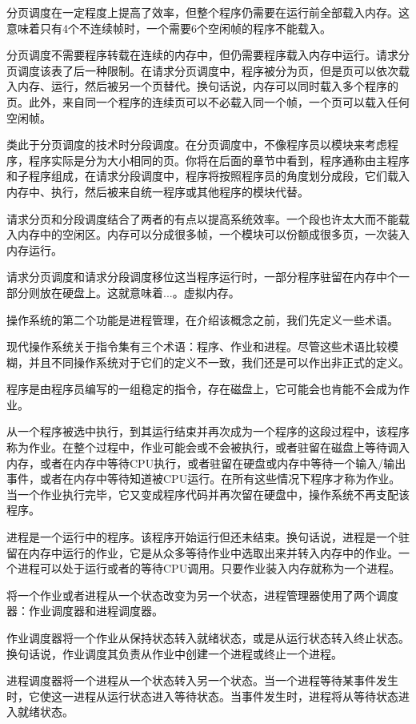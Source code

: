 分页调度在一定程度上提高了效率，但整个程序仍需要在运行前全部载入内存。这意味着只有4个不连续帧时，一个需要6个空闲帧的程序不能载入。

分页调度不需要程序转载在连续的内存中，但仍需要程序载入内存中运行。请求分页调度该表了后一种限制。在请求分页调度中，程序被分为页，但是页可以依次载入内存、运行，然后被另一个页替代。换句话说，内存可以同时载入多个程序的页。此外，来自同一个程序的连续页可以不必载入同一个帧，一个页可以载入任何空闲帧。

类此于分页调度的技术时分段调度。在分页调度中，不像程序员以模块来考虑程序，程序实际是分为大小相同的页。你将在后面的章节中看到，程序通称由主程序和子程序组成，在请求分段调度中，程序将按照程序员的角度划分成段，它们载入内存中、执行，然后被来自统一程序或其他程序的模块代替。

请求分页和分段调度结合了两者的有点以提高系统效率。一个段也许太大而不能载入内存中的空闲区。内存可以分成很多帧，一个模块可以份额成很多页，一次装入内存运行。

请求分页调度和请求分段调度移位这当程序运行时，一部分程序驻留在内存中个一部分则放在硬盘上。这就意味着...。虚拟内存。

操作系统的第二个功能是进程管理，在介绍该概念之前，我们先定义一些术语。

现代操作系统关于指令集有三个术语：程序、作业和进程。尽管这些术语比较模糊，并且不同操作系统对于它们的定义不一致，我们还是可以作出非正式的定义。

程序是由程序员编写的一组稳定的指令，存在磁盘上，它可能会也肯能不会成为作业。

从一个程序被选中执行，到其运行结束并再次成为一个程序的这段过程中，该程序称为作业。在整个过程中，作业可能会或不会被执行，或者驻留在磁盘上等待调入内存，或者在内存中等待CPU执行，或者驻留在硬盘或内存中等待一个输入/输出事件，或者在内存中等待知道被CPU运行。在所有这些情况下程序才称为作业。当一个作业执行完毕，它又变成程序代码并再次留在硬盘中，操作系统不再支配该程序。

进程是一个运行中的程序。该程序开始运行但还未结束。换句话说，进程是一个驻留在内存中运行的作业，它是从众多等待作业中选取出来并转入内存中的作业。一个进程可以处于运行或者的等待CPU调用。只要作业装入内存就称为一个进程。

将一个作业或者进程从一个状态改变为另一个状态，进程管理器使用了两个调度器：作业调度器和进程调度器。

作业调度器将一个作业从保持状态转入就绪状态，或是从运行状态转入终止状态。换句话说，作业调度其负责从作业中创建一个进程或终止一个进程。

进程调度器将一个进程从一个状态转入另一个状态。当一个进程等待某事件发生时，它使这一进程从运行状态进入等待状态。当事件发生时，进程将从等待状态进入就绪状态。

